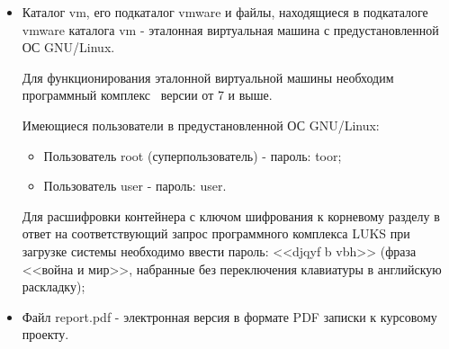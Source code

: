 \begin{itemize}
\begin{itemize}
		\end{itemize}

	\item Каталог vm, его подкаталог vmware и файлы, находящиеся в подкаталоге vmware каталога vm - эталонная виртуальная машина с предустановленной ОС GNU/Linux.

		Для функционирования эталонной виртуальной машины необходим программный комплекс \virtpo\ версии от 7 и выше.

		Имеющиеся пользователи в предустановленной ОС GNU/Linux:

		\begin{itemize}

			\item Пользователь root (суперпользователь) - пароль: toor;
			\item Пользователь user - пароль: user.

		\end{itemize}

		Для расшифровки контейнера с ключом шифрования к корневому разделу в ответ на соответствующий запрос программного комплекса LUKS при загрузке
		системы необходимо ввести пароль: <<djqyf b vbh>> (фраза <<война и мир>>, набранные без переключения клавиатуры в английскую раскладку);

	\item Файл report.pdf - электронная версия в формате PDF записки к курсовому проекту.

\end{itemize}

